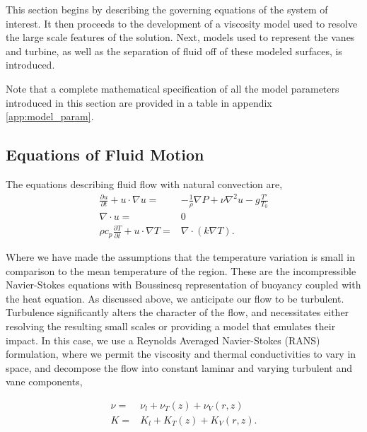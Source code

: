 This section begins by describing the governing equations of the system
of interest. It then proceeds to the development of a viscosity model
used to resolve the large scale features of the solution. Next, models
used to represent the vanes and turbine, as well as the separation of
fluid off of these modeled surfaces, is introduced.  

Note that a complete mathematical specification of all the model
parameters introduced in this section are provided in a table in
appendix \ref{app:model_param}.

\subsection{Equations of Fluid Motion}
%
%

The equations describing fluid flow with natural convection are,
\begin{eqnarray*}
 \frac{\partial u}{\partial t} + u \cdot \nabla u =&
  -\frac{1}{\rho}\nabla P + \nu \nabla^2 u - g \frac{T'}{T_0}\\
 \nabla \cdot u =& 0 \\
 \rho c_p \frac{\partial T}{\partial t} + u \cdot \nabla T =& \nabla \cdot ( k \nabla T).
\end{eqnarray*} 

Where we have made the assumptions that the temperature variation is small in
comparison to the mean temperature of the region. These are the
incompressible Navier-Stokes equations with Boussinesq representation of
buoyancy coupled with the heat equation.  
%
%
%
As discussed above, we anticipate our flow to be
turbulent. Turbulence significantly alters the character of the flow,
and necessitates either resolving the resulting small scales or
providing a model that emulates their impact. In this case, we use a
Reynolds Averaged Navier-Stokes (RANS) formulation, where we 
permit the viscosity and thermal conductivities to vary in space, and
decompose the flow into constant laminar and varying turbulent and vane
components,  


\begin{eqnarray*}
 \nu =& \nu_{l} + \nu_{T}(z) + \nu_{V}(r,z) \\
 K =& K_{l} + K_{T}(z) + K_{V}(r,z).
\end{eqnarray*}

